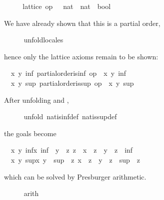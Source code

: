 \begin{isabellebody}
\isamarkupfalse%
\ {\isacharminus}\isanewline
\ \ \isamarkupfalse%
\ {\isachardoublequoteopen}lattice\ {\isacharparenleft}op\ {\isasymle}\ {\isacharcolon}{\isacharcolon}\ nat\ {\isasymRightarrow}\ nat\ {\isasymRightarrow}\ bool{\isacharparenright}{\isachardoublequoteclose}%
\begin{isamarkuptxt}%
We have already shown that this is a partial order,%
\end{isamarkuptxt}%
\isamarkuptrue%
\ \ \ \ \isamarkupfalse%
\ unfold{\isacharunderscore}locales%
\begin{isamarkuptxt}%
hence only the lattice axioms remain to be shown: \begin{isabelle}%
\ {}{\isachardot}\ {\isasymAnd}x\ y{\isachardot}\ {\isasymexists}inf{\isachardot}\ partial{\isacharunderscore}order{\isachardot}is{\isacharunderscore}inf\ op\ {\isasymle}\ x\ y\ inf\isanewline
\ {}{\isachardot}\ {\isasymAnd}x\ y{\isachardot}\ {\isasymexists}sup{\isachardot}\ partial{\isacharunderscore}order{\isachardot}is{\isacharunderscore}sup\ op\ {\isasymle}\ x\ y\ sup%
\end{isabelle}  After unfolding  and ,%
\end{isamarkuptxt}%
\isamarkuptrue%
\ \ \ \ \isamarkupfalse%
\ {\isacharparenleft}unfold\ nat{\isachardot}is{\isacharunderscore}inf{\isacharunderscore}def\ nat{\isachardot}is{\isacharunderscore}sup{\isacharunderscore}def{\isacharparenright}%
\begin{isamarkuptxt}%
the goals become \begin{isabelle}%
\ {}{\isachardot}\ {\isasymAnd}x\ y{\isachardot}\ {\isasymexists}inf{\isasymle}x{\isachardot}\ inf\ {\isasymle}\ y\ {\isasymand}\ {\isacharparenleft}{\isasymforall}z{\isachardot}\ z\ {\isasymle}\ x\ {\isasymand}\ z\ {\isasymle}\ y\ {\isasymlongrightarrow}\ z\ {\isasymle}\ inf{\isacharparenright}\isanewline
\ {}{\isachardot}\ {\isasymAnd}x\ y{\isachardot}\ {\isasymexists}sup{\isasymge}x{\isachardot}\ y\ {\isasymle}\ sup\ {\isasymand}\ {\isacharparenleft}{\isasymforall}z{\isachardot}\ x\ {\isasymle}\ z\ {\isasymand}\ y\ {\isasymle}\ z\ {\isasymlongrightarrow}\ sup\ {\isasymle}\ z{\isacharparenright}%
\end{isabelle} which can be solved
      by Presburger arithmetic.%
\end{isamarkuptxt}%
\isamarkuptrue%
\ \ \ \ \isamarkupfalse%
\ arith{\isacharplus}%

\end{isabellebody}
